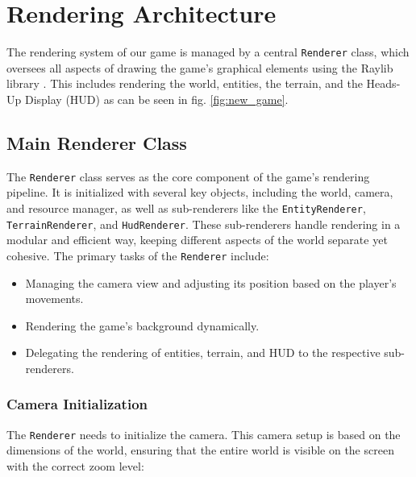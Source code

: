 \section{Rendering Architecture}
The rendering system of our game is managed by a central \texttt{Renderer} class, which oversees all aspects of drawing the game's graphical elements using the Raylib library \cite{raylib}. This includes rendering the world, entities, the terrain, and the Heads-Up Display (HUD) as can be seen in fig. \ref{fig:new_game}.



  \subsection{Main Renderer Class}

The \texttt{Renderer} class serves as the core component of the game's rendering pipeline. It is initialized with several key objects, including the world, camera, and resource manager, as well as sub-renderers like the \texttt{EntityRenderer}, \texttt{TerrainRenderer}, and \texttt{HudRenderer}. These sub-renderers handle rendering in a modular and efficient way, keeping different aspects of the world separate yet cohesive. The primary tasks of the \texttt{Renderer} include:

    \begin{itemize}
        \item Managing the camera view and adjusting its position based on the player's movements.
        \item Rendering the game's background dynamically.
        \item Delegating the rendering of entities, terrain, and HUD to the respective sub-renderers.
    \end{itemize}

  \subsubsection{Camera Initialization}

    The \texttt{Renderer} needs to initialize the camera. This camera setup is based on the dimensions of the world, ensuring that the entire world is visible on the screen with the correct zoom level:

